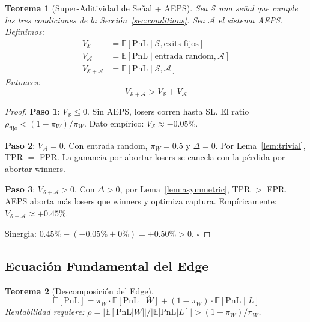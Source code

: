 \documentclass[11pt,a4paper]{article}
\newtheorem{theorem}{Teorema}[section]
\newcommand{\E}{\mathbb{E}}
\begin{document}
\begin{theorem}[Super-Aditividad de Se\~nal + AEPS]
\label{thm:superadd}
Sea $\mathcal{S}$ una se\~nal que cumple las tres condiciones de la
Secci\'on~\ref{sec:conditions}. Sea $\mathcal{A}$ el sistema AEPS.
Definimos:
\begin{align}
V_{\mathcal{S}} &= \E[\text{PnL} \mid \mathcal{S}, \text{exits fijos}] \\
V_{\mathcal{A}} &= \E[\text{PnL} \mid \text{entrada random}, \mathcal{A}] \\
V_{\mathcal{S}+\mathcal{A}} &= \E[\text{PnL} \mid \mathcal{S}, \mathcal{A}]
\end{align}
Entonces:
\begin{equation}
\boxed{V_{\mathcal{S}+\mathcal{A}} > V_{\mathcal{S}} + V_{\mathcal{A}}}
\end{equation}
\end{theorem}

\begin{proof}
\textbf{Paso 1}: $V_{\mathcal{S}} \leq 0$. Sin AEPS, losers corren
hasta SL. El ratio $\rho_{\text{fijo}} < (1-\pi_W)/\pi_W$. Dato
emp\'irico: $V_{\mathcal{S}} \approx -0.05\%$.

\textbf{Paso 2}: $V_{\mathcal{A}} = 0$. Con entrada random,
$\pi_W = 0.5$ y $\Delta = 0$. Por Lema~\ref{lem:trivial},
TPR $=$ FPR. La ganancia por abortar losers se cancela con la
p\'erdida por abortar winners.

\textbf{Paso 3}: $V_{\mathcal{S}+\mathcal{A}} > 0$. Con $\Delta > 0$,
por Lema~\ref{lem:asymmetric}, TPR $>$ FPR. AEPS aborta m\'as losers
que winners y optimiza captura. Emp\'iricamente:
$V_{\mathcal{S}+\mathcal{A}} \approx +0.45\%$.

Sinergia: $0.45\% - (-0.05\% + 0\%) = +0.50\% > 0$. $\square$
\end{proof}


\subsection{Ecuaci\'on Fundamental del Edge}

\begin{theorem}[Descomposici\'on del Edge]
\label{thm:edge}
\begin{equation}
\E[\text{PnL}] = \pi_W \cdot \E[\text{PnL} \mid W]
  + (1-\pi_W) \cdot \E[\text{PnL} \mid L]
\end{equation}
Rentabilidad requiere:
$\rho = |\E[\text{PnL}|W]| / |\E[\text{PnL}|L]| > (1-\pi_W)/\pi_W$.
\end{theorem}
\end{document}
